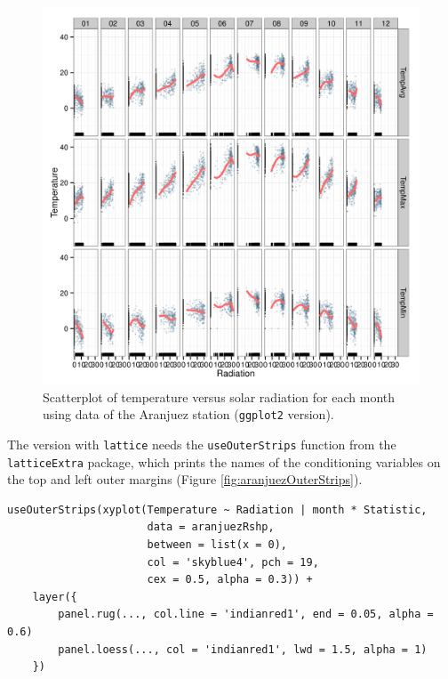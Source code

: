 \begin{figure}[htbp]
\centering
\includegraphics[width=.9\linewidth]{figs/aranjuezFacetGrid.png}
\caption{Scatterplot of temperature versus solar radiation for each month using data of the Aranjuez station (\texttt{ggplot2} version). \label{fig:aranjuezFacetGrid}}
\end{figure}

The version with \texttt{lattice} needs the \texttt{useOuterStrips} function from
the \texttt{latticeExtra} package, which prints the names of the conditioning
variables on the top and left outer margins (Figure
 \ref{fig:aranjuezOuterStrips}).


\lstset{language=r,label= ,caption= ,captionpos=b,numbers=none}
\begin{lstlisting}
useOuterStrips(xyplot(Temperature ~ Radiation | month * Statistic,
                      data = aranjuezRshp,
                      between = list(x = 0),
                      col = 'skyblue4', pch = 19,
                      cex = 0.5, alpha = 0.3)) +
    layer({
        panel.rug(..., col.line = 'indianred1', end = 0.05, alpha = 0.6)
        panel.loess(..., col = 'indianred1', lwd = 1.5, alpha = 1)
    })
\end{lstlisting}

